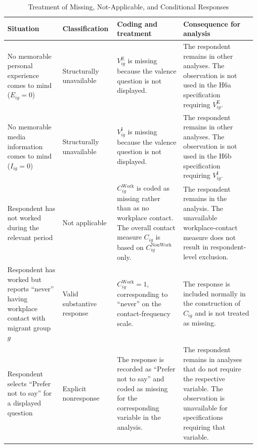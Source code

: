 \begin{table}[H]
\centering
\caption{Treatment of Missing, Not-Applicable, and Conditional Responses}
\label{tab:missing_responses}

\small

\begin{tabularx}{\textwidth}{
    >{\raggedright\arraybackslash}p{3.2cm}
    >{\raggedright\arraybackslash}p{2.5cm}
    >{\raggedright\arraybackslash}X
    >{\raggedright\arraybackslash}X
}
\toprule
\textbf{Situation} &
\textbf{Classification} &
\textbf{Coding and treatment} &
\textbf{Consequence for analysis} \\
\midrule

No memorable personal experience comes to mind
(\(E_{ig}=0\))
&
Structurally unavailable
&
\(V_{ig}^{\mathrm{E}}\) is missing because the valence question is not displayed.
&
The respondent remains in other analyses. The observation is not used in the H6a specification requiring \(V_{ig}^{\mathrm{E}}\).
\\
\addlinespace

No memorable media information comes to mind
(\(I_{ig}=0\))
&
Structurally unavailable
&
\(V_{ig}^{\mathrm{I}}\) is missing because the valence question is not displayed.
&
The respondent remains in other analyses. The observation is not used in the H6b specification requiring \(V_{ig}^{\mathrm{I}}\).
\\
\addlinespace

Respondent has not worked during the relevant period
&
Not applicable
&
\(C_{ig}^{\mathrm{Work}}\) is coded as missing rather than as no workplace contact. The overall contact measure \(C_{ig}\) is based on \(C_{ig}^{\mathrm{NonWork}}\) only.
&
The respondent remains in the analysis. The unavailable workplace-contact measure does not result in respondent-level exclusion.
\\
\addlinespace

Respondent has worked but reports ``never'' having workplace contact with migrant group \(g\)
&
Valid substantive response
&
\(C_{ig}^{\mathrm{Work}}=1\), corresponding to ``never'' on the contact-frequency scale.
&
The response is included normally in the construction of \(C_{ig}\) and is not treated as missing.
\\
\addlinespace

Respondent selects ``Prefer not to say'' for a displayed question
&
Explicit nonresponse
&
The response is recorded as ``Prefer not to say'' and coded as missing for the corresponding variable in the analysis.
&
The respondent remains in analyses that do not require the respective variable. The observation is unavailable for specifications requiring that variable.
\\
\bottomrule
\end{tabularx}


\end{table}
